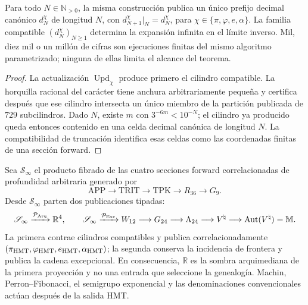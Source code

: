 \begin{corollary}
\label{cor:generacion-nonadica-profundidad-arbitraria-rev10}
Para todo \(N\in\mathbb N_{>0}\), la misma construcción publica un único
prefijo decimal canónico \(d_N^\chi\) de longitud \(N\), con
\(d_{N+1}^\chi|_N=d_N^\chi\), para
\(\chi\in\{\pi,\varphi,e,\alpha\}\). La familia compatible
\((d_N^\chi)_{N\ge1}\) determina la expansión infinita en el límite
inverso. Mil, diez mil o un millón de cifras son ejecuciones finitas del
mismo algoritmo parametrizado; ninguna de ellas limita el alcance del
teorema.
\end{corollary}

\begin{proof}
La actualización \(\operatorname{Upd}_\chi\) produce primero el cilindro
compatible. La horquilla racional del carácter tiene anchura arbitrariamente
pequeña y certifica después que ese cilindro intersecta un único miembro de
la partición publicada de \(729\) subcilindros. Dado \(N\), existe \(m\) con
\(3^{-6m}<10^{-N}\); el cilindro ya producido queda entonces contenido en una
celda decimal canónica de longitud \(N\). La compatibilidad de truncación
identifica esas celdas como las coordenadas finitas de una sección forward.
\end{proof}

\begin{theorem}
\label{thm:estado-coinductivo-doble-proyeccion-rev10}
Sea \(\mathscr S_\infty\) el producto fibrado de las cuatro secciones
forward correlacionadas de profundidad arbitraria generado por
\[
 \mathrm{APP}\longrightarrow\mathrm{TRIT}\longrightarrow\mathrm{TPK}
 \longrightarrow R_{36}\longrightarrow G_9.
\]
Desde \(\mathscr S_\infty\) parten dos publicaciones tipadas:
\[
 \mathscr S_\infty\xrightarrow{\mathcal P_{\rm Arq}}\mathbb R^4,
 \qquad
 \mathscr S_\infty\xrightarrow{\mathcal P_{\rm Exc}}
 W_{12}\longrightarrow G_{24}\longrightarrow\Lambda_{24}
 \longrightarrow V^\natural
 \longrightarrow\operatorname{Aut}(V^\natural)=\mathbb M.
\]
La primera contrae cilindros compatibles y publica correlacionadamente
\((\pi_{\rm HMT},\varphi_{\rm HMT},e_{\rm HMT},\alpha_{\rm HMT})\); la
segunda conserva la incidencia de frontera y publica la cadena excepcional.
En consecuencia, \(\mathbb R\) es la sombra arquimediana de la primera
proyección y no una entrada que seleccione la genealogía. Machin,
Perron--Fibonacci, el semigrupo exponencial y las denominaciones
convencionales actúan después de la salida HMT.
\end{theorem}


